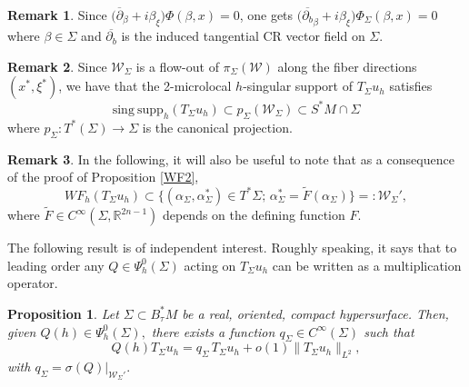 \documentclass[11pt,reqno]{amsart}
\newcommand{\R}{{\mathbb R}}
\newtheorem{proposition}[theorem]{Proposition}
\theoremstyle{definition}
\newtheorem{remark}{Remark}
\begin{document}
\begin{remark}
    Since $ \big( \overline{\partial}_{\beta} + i \beta_{\xi} \big) \Phi(\beta,x)  = 0$, one gets $\big( \overline{\partial_b}_{\beta} + i \beta_{\xi} ) \Phi_{\Sigma}(\beta,x) = 0$ where $\beta \in \Sigma$ and $\overline{\partial_b }$ is the induced tangential CR vector field on $\Sigma$. 
\end{remark} 
\begin{remark}
    Since $\mathcal{W}_{\Sigma}$ is a flow-out of $\pi_{\Sigma}(\mathcal{W})$ along the fiber directions $(x^*,\xi^*)$, we have that the 2-microlocal $h$-singular support of $T_{\Sigma}u_h$ satisfies
    \begin{equation}\label{singsupp}
    \mathrm{sing~supp}_h(T_{\Sigma}u_h)\subset p_{\Sigma}(\mathcal{W}_{\Sigma})\subset S^*M\cap \Sigma
    \end{equation}
    where $p_{\Sigma}:T^*(\Sigma)\to \Sigma$ is the canonical projection.
\end{remark}
\begin{remark} In the following, it will also be useful to note that as a consequence of the proof of Proposition \ref{WF2}, 
\begin{equation} \label{refinement}
WF_{h}(T_{\Sigma} u_h ) \subset \{ (\alpha_{\Sigma}, \alpha_{\Sigma}^{*}) \in T^*\Sigma; \, \alpha_{\Sigma}^* = \tilde{F}(\alpha_{\Sigma}) \} =: {\mathcal W}_{\Sigma}',
\end{equation}
where $\tilde{F} \in C^{\infty}(\Sigma, \R^{2n-1})$ depends on the defining function $F.$
\end{remark}

The following result is of independent interest. Roughly speaking, it says that to leading order any $Q \in \Psi_h^{0}(\Sigma)$ acting on $T_{\Sigma} u_h$ can be written as a multiplication operator.





\begin{proposition} \label{multiplier}
Let $\Sigma \subset B_{\tau}^*M$ be a real, oriented,  compact hypersurface. Then, given $Q(h) \in \Psi_h^{0}(\Sigma),$ there exists a {\em function} $q_{\Sigma} \in C^{\infty}(\Sigma)$ such that
$$ Q(h) T_{\Sigma} u_h = q_{\Sigma} \,T_{\Sigma} u_h + o(1) \| T_{\Sigma} u_h \|_{L^2},$$
with $q_{\Sigma} = \sigma(Q) |_{{\mathcal W}_{\Sigma}'}.$ 
\end{proposition}
\end{document}
